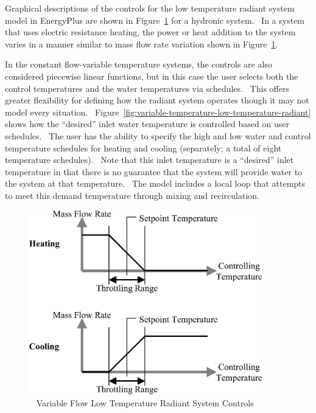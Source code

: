Graphical descriptions of the controls for the low temperature radiant system model in EnergyPlus are shown in Figure~\ref{fig:variable-flow-low-temperature-radiant-system} for a hydronic system.~ In a system that uses electric resistance heating, the power or heat addition to the system varies in a manner similar to mass flow rate variation shown in Figure~\ref{fig:variable-flow-low-temperature-radiant-system}.

In the constant flow-variable temperature systems, the controls are also considered piecewise linear functions, but in this case the user selects both the control temperatures and the water temperatures via schedules.~ This offers greater flexibility for defining how the radiant system operates though it may not model every situation.~ Figure~\ref{fig:variable-temperature-low-temperature-radiant} shows how the ``desired'' inlet water temperature is controlled based on user schedules.~ The user has the ability to specify the high and low water and control temperature schedules for heating and cooling (separately; a total of eight temperature schedules).~ Note that this inlet temperature is a ``desired'' inlet temperature in that there is no guarantee that the system will provide water to the system at that temperature.~ The model includes a local loop that attempts to meet this demand temperature through mixing and recirculation.

\begin{figure}[hbtp] %
\centering
\includegraphics[width=0.9\textwidth, height=0.9\textheight, keepaspectratio=true]{media/image6053.png}
\caption{  Variable Flow Low Temperature Radiant System Controls \protect \label{fig:variable-flow-low-temperature-radiant-system}}
\end{figure}

